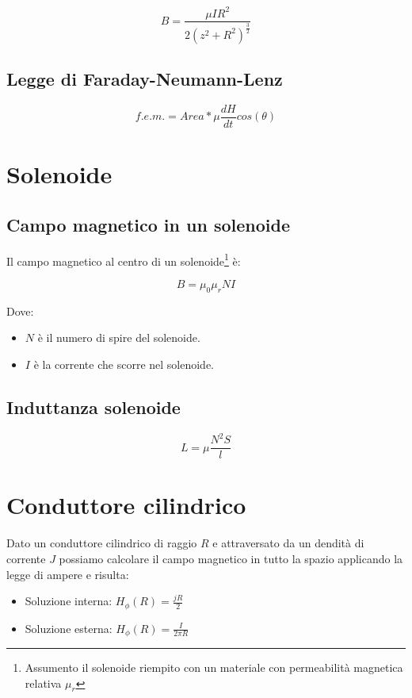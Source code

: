 \documentclass[10pt,a4paper]{report}
\begin{document}
			\begin{equation}
			B=\frac{\mu IR^2}{2(z^2+R^2)^{\frac{3}{2}}}
			\end{equation}

		\subsection{Legge di Faraday-Neumann-Lenz}

		\[
		f.e.m.=Area* \mu \frac{dH}{dt} cos(\theta) 
		\]

	\section{Solenoide}
		\subsection{Campo magnetico in un solenoide}
			Il campo magnetico al centro di un solenoide\footnote{Assumento il solenoide riempito con un materiale con permeabilità magnetica relativa $\mu_r$} è:

			\begin{equation}
			B=\mu_0\mu_rNI
			\end{equation}

			Dove:

			\begin{itemize}
			\item $N$ è il numero di spire del solenoide.
			\item $I$ è la corrente che scorre nel solenoide.
			\end{itemize}

		\subsection{Induttanza solenoide}
				\begin{equation} 
				L=\mu \frac{N^2S}{l}
				\label{eq:induttanza-solenoide}
				\end{equation}

	\section{Conduttore cilindrico}
		Dato un conduttore cilindrico di raggio $R$ e attraversato da un dendità di corrente $J$ possiamo calcolare il campo magnetico in tutto la spazio applicando la legge di ampere e risulta:

		\begin{itemize}
		\item Soluzione interna: $H_\phi(R)=\frac{jR}{2}$ 
		\item Soluzione esterna: $H_\phi(R)=\frac{I}{2\pi R}$

		\end{itemize}
\end{document}
